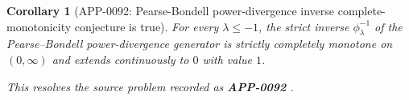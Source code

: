 \documentclass[11pt]{article}
\numberwithin{equation}{section}
\newtheorem{corollary}[theorem]{Corollary}
\theoremstyle{definition}
\theoremstyle{remark}
\newcommand{\1}{\mathbf 1}
\begin{document}
\begin{corollary}[APP-0092: Pearse-Bondell power-divergence inverse complete-monotonicity conjecture is true]
\label{res:pd-inverse-complete-monotonicity-all-lambda-leminusone}
For every \(\lambda\le -1\), the strict inverse \(\phi_\lambda^{-1}\) of the Pearse--Bondell power-divergence generator is strictly completely monotone on \((0,\infty)\) and extends continuously to \(0\) with value \(1\).



This resolves the source problem recorded as \textbf{APP-0092} \cite{app-app-0092-source}.
\end{corollary}
\end{document}
